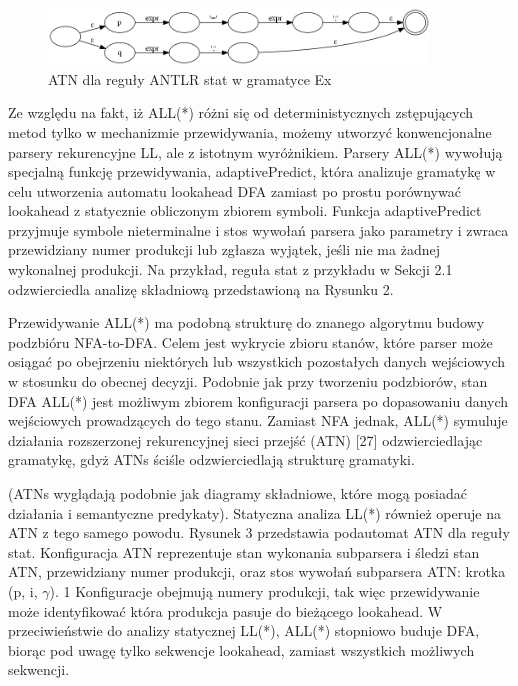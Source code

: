 \begin{figure}[h]
\includegraphics[width=0.9\textwidth]{Figure3.png}
\caption{ATN dla reguły ANTLR stat w gramatyce Ex}
\end{figure}
\par
Ze względu na fakt, iż ALL(*) różni się od deterministycznych zstępujących
metod tylko w mechanizmie przewidywania, możemy utworzyć konwencjonalne parsery
rekurencyjne LL, ale z istotnym wyróżnikiem.
Parsery ALL(*) wywołują specjalną funkcję przewidywania, adaptivePredict,
która analizuje gramatykę w celu utworzenia automatu lookahead DFA
zamiast po prostu porównywać lookahead z statycznie obliczonym zbiorem symboli.
Funkcja adaptivePredict przyjmuje symbole nieterminalne i stos wywołań parsera
jako parametry i zwraca przewidziany numer produkcji lub zgłasza wyjątek,
jeśli nie ma żadnej wykonalnej produkcji. Na przykład, reguła stat z przykładu
w Sekcji 2.1 odzwierciedla analizę składniową przedstawioną na Rysunku 2.
\par
Przewidywanie ALL(*) ma podobną strukturę do znanego algorytmu budowy
podzbióru NFA-to-DFA. Celem jest wykrycie zbioru stanów, które parser może
osiągać po obejrzeniu niektórych lub wszystkich pozostałych danych wejściowych
w stosunku do obecnej decyzji. Podobnie jak przy  tworzeniu podzbiorów,
stan DFA ALL(*) jest możliwym zbiorem konfiguracji parsera po dopasowaniu
danych wejściowych prowadzących do tego stanu. Zamiast NFA jednak, ALL(*) symuluje
działania rozszerzonej rekurencyjnej sieci przejść (ATN) [27]
odzwierciedlając gramatykę, gdyż ATNs ściśle odzwierciedlają strukturę gramatyki.
\par
(ATNs wyglądają podobnie jak diagramy składniowe, które mogą posiadać działania
i semantyczne predykaty). Statyczna analiza LL(*) również operuje na ATN z tego
samego powodu. Rysunek 3 przedstawia podautomat ATN dla reguły stat.
Konfiguracja ATN reprezentuje stan wykonania subparsera i śledzi stan ATN,
przewidziany numer produkcji, oraz stos wywołań subparsera ATN: krotka (p, i, $\gamma$).
1 Konfiguracje obejmują numery produkcji, tak więc przewidywanie może identyfikować
która produkcja pasuje do bieżącego lookahead.
W przeciwieństwie do analizy statycznej LL(*), ALL(*) stopniowo buduje DFA,
biorąc pod uwagę tylko sekwencje lookahead, zamiast wszystkich możliwych sekwencji.


